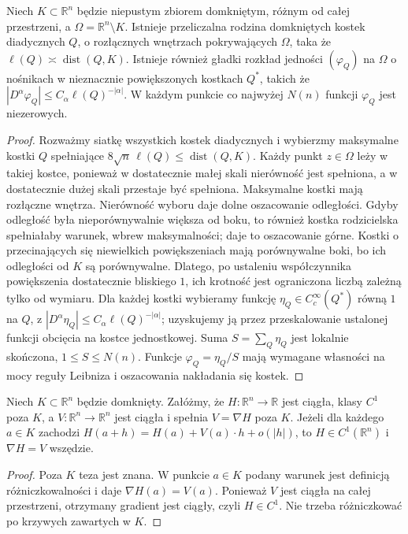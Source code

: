 \begin{lemat}
\label{lem:dzety-whitney-cubes}
Niech $K\subset\mathbb R^n$ będzie niepustym zbiorem
domkniętym, różnym od całej przestrzeni, a
$\Omega=\mathbb R^n\setminus K$. Istnieje przeliczalna
rodzina domkniętych kostek diadycznych $Q$, o rozłącznych
wnętrzach pokrywających $\Omega$, taka że
$\ell(Q)\asymp\operatorname{dist}(Q,K)$. Istnieje
również gładki rozkład jedności $(\varphi_Q)$ na $\Omega$
o nośnikach w nieznacznie powiększonych kostkach $Q^*$,
takich że
$|D^\alpha\varphi_Q|\le C_\alpha\ell(Q)^{-|\alpha|}$.
W każdym punkcie co najwyżej $N(n)$ funkcji
$\varphi_Q$ jest niezerowych.
\end{lemat}
\begin{proof}
Rozważmy siatkę wszystkich kostek diadycznych i wybierzmy
maksymalne kostki $Q$ spełniające
$8\sqrt n\,\ell(Q)\le\operatorname{dist}(Q,K)$.
Każdy punkt $z\in\Omega$ leży w takiej kostce, ponieważ
w dostatecznie małej skali nierówność jest spełniona,
a w dostatecznie dużej skali przestaje być spełniona.
Maksymalne kostki mają rozłączne wnętrza.
Nierówność wyboru daje dolne oszacowanie odległości.
Gdyby odległość była nieporównywalnie większa od boku,
to również kostka rodzicielska spełniałaby warunek,
wbrew maksymalności; daje to oszacowanie górne.
Kostki o przecinających się niewielkich powiększeniach
mają porównywalne boki, bo ich odległości od $K$
są porównywalne. Dlatego, po ustaleniu współczynnika
powiększenia dostatecznie bliskiego $1$, ich krotność
jest ograniczona liczbą zależną tylko od wymiaru.
Dla każdej kostki wybieramy funkcję $\eta_Q\in C_c^\infty(Q^*)$
równą $1$ na $Q$, z
$|D^\alpha\eta_Q|\le C_\alpha\ell(Q)^{-|\alpha|}$;
uzyskujemy ją przez przeskalowanie ustalonej funkcji
obcięcia na kostce jednostkowej. Suma
$S=\sum_Q\eta_Q$ jest lokalnie skończona,
$1\le S\le N(n)$. Funkcje
$\varphi_Q=\eta_Q/S$ mają wymagane własności
na mocy reguły Leibniza i oszacowania nakładania się
kostek.
\end{proof}

\begin{lemat}
\label{lem:dzety-glue}
Niech $K\subset\mathbb R^n$ będzie domknięty. Załóżmy, że
$H:\mathbb R^n\to\mathbb R$ jest ciągła, klasy $C^1$ poza $K$,
a $V:\mathbb R^n\to\mathbb R^n$ jest ciągła i spełnia
$V=\nabla H$ poza $K$. Jeżeli dla każdego $a\in K$
zachodzi $H(a+h)=H(a)+V(a)\cdot h+o(|h|)$, to
$H\in C^1(\mathbb R^n)$ i $\nabla H=V$ wszędzie.
\end{lemat}
\begin{proof}
Poza $K$ teza jest znana. W punkcie $a\in K$ podany
warunek jest definicją różniczkowalności i daje
$\nabla H(a)=V(a)$. Ponieważ $V$ jest ciągła na całej
przestrzeni, otrzymany gradient jest ciągły, czyli
$H\in C^1$. Nie trzeba różniczkować po krzywych
zawartych w $K$.
\end{proof}

